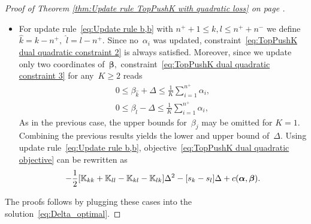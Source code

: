\begin{proof}[Proof of Theorem \ref{thm:Update rule TopPushK with quadratic loss} on page \pageref{thm:Update rule TopPushK with quadratic loss}]
\begin{itemize}
    \item For update rule~\eqref{eq:Update rule b,b} with $n^+ + 1\le k,l \le n^+ + n^-$ we define $\hat{k} = k - n^+,$ $\hat{l} = l - n^+.$ Since no~$\alpha_i$ was updated, constraint~\eqref{eq:TopPushK dual quadratic constraint 2} is always satisfied. Moreover, since we update only two coordinates of~$\bm{\beta},$ constraint~\eqref{eq:TopPushK dual quadratic constraint 3} for any~$K \geq 2$ reads
    \begin{equation}\label{eq: TopPushK dual quadratic b,b - bounds}
      \begin{aligned}
        0 \leq \beta_{\hat{k}} + \Delta \leq \frac{1}{K} \sum_{i = 1}^{n^+} \alpha_i, \\
        0 \leq \beta_{\hat{l}} - \Delta \leq \frac{1}{K} \sum_{i = 1}^{n^+} \alpha_i,
      \end{aligned}
    \end{equation}
    As in the previous case, the upper bounds for~$\beta_j$ may be omitted for $K = 1$. Combining the previous results yields the lower and upper bound of~$\Delta.$ Using update rule~\eqref{eq:Update rule b,b}, objective~\eqref{eq:TopPushK dual quadratic objective} can be rewritten as
    \begin{equation*}
      - \frac{1}{2} \Brac[s]{\K_{kk} + \K_{ll} - \K_{kl} - \K_{lk}} \Delta^2 - \Brac[s]{s_k - s_l} \Delta + c(\bm{\alpha}, \bm{\beta}).
    \end{equation*}
  \end{itemize}
  The proofs follows by plugging these cases into the solution~\eqref{eq:Delta_optimal}.
\end{proof}


\subsection{\PatMat}

